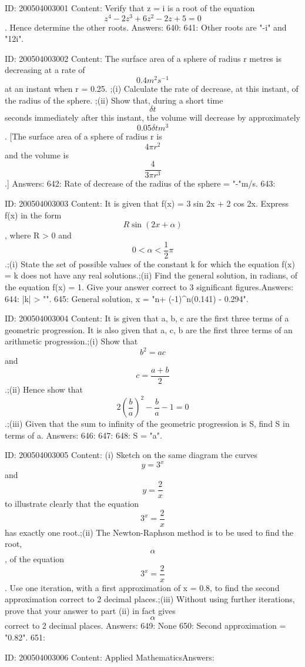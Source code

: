 \documentclass{article}
\begin{document}
ID: 200504003001
Content:
Verify that z = i is a root of the equation  $$z^4  - 2z^3  + 6z^2  - 2z + 5 = 0$$. Hence determine the other roots.  Answers:
640: 
641: Other roots are "-i" and "1\pm2i".

ID: 200504003002
Content:
The surface area of a sphere of radius r metres is decreasing at a rate of  $$0.4m^2 s^{-1} $$ at an instant when r = 0.25. ;(i) Calculate the rate of decrease, at this instant, of the radius of the sphere. ;(ii) Show that, during a short time  $$\delta t$$ seconds immediately after this instant, the volume will decrease by approximately  $$0.05\delta tm^3 $$.  [The surface area of a sphere of radius r is  $$4\pi r^2 $$ and the volume is  $$\frac{4}{3\pi r^3} $$.] Answers:
642: Rate of decrease of the radius of the sphere = "-"m/s.
643: 

ID: 200504003003
Content:
It is given that f(x) = 3 sin 2x + 2 cos 2x. Express f(x) in the form  $$R\sin ( 2x + \alpha )$$, where R > 0 and  $$0 < \alpha  < \frac{1}{2}\pi $$.;(i) State the set of possible values of the constant k for which the equation f(x) = k does not have any real solutions.;(ii) Find the general solution, in radians, of the equation f(x) = 1. Give your answer correct to 3 significant figures.Answers:
644:  |k| > "".
645: General solution, x = "n\pi + (-1)^n(0.141) - 0.294".

ID: 200504003004
Content:
It is given that a, b, c are the first three terms of a geometric progression. It is also given that a, c, b are the first three terms of an arithmetic progression.;(i) Show that  $$b^2  = ac$$ and  $$c = \frac{a +b}{2}$$.;(ii) Hence show that  $$2(\frac{b}{a})^2  -  \frac{b}{a} - 1 = 0$$.;(iii) Given that the sum to infinity of the geometric progression is S, find S in terms of a. Answers:
646: 
647: 
648: S = "a".

ID: 200504003005
Content:
(i) Sketch on the same diagram the curves  $$y = 3^x $$ and  $$y = \frac{2}{x}$$ to illustrate clearly that the equation  $$3^x  = \frac{2}{x}$$ has exactly one root.;(ii) The Newton-Raphson method is to be used to find the root,  $$\alpha $$, of the equation  $$3^x  = \frac{2}{x}$$. Use one iteration, with a first approximation of x = 0.8, to find the second approximation correct to 2 decimal places.;(iii) Without using further iterations, prove that your answer to part (ii) in fact gives  $$\alpha $$ correct to 2 decimal places. Answers:
649: None
650: Second approximation = "0.82".
651: 

ID: 200504003006
Content:
Applied MathematicsAnswers:
\end{document}
